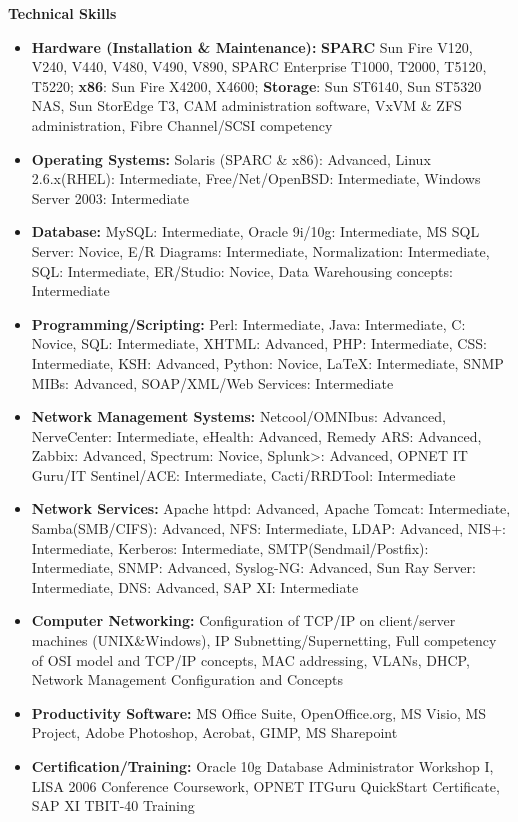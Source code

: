 \documentclass[10pt,oneside]{article}
\newenvironment{ressection}[1]{
	\vspace{4pt}
	\textbf{\selectfont\normalsize#1}
	\begin{itemize}
	\vspace{3pt}
}{
	\end{itemize}
}
\newcommand{\resitem}[1]{
	\vspace{-4pt}
	\item \begin{flushleft} #1 \end{flushleft}
}
\begin{document}
\begin{ressection}{Technical Skills}

	\resitem{\textbf{Hardware (Installation \& Maintenance):} \textbf{SPARC} Sun Fire V120, V240, V440, V480, V490, V890, SPARC Enterprise T1000, T2000, T5120, T5220; \textbf{x86}: Sun Fire X4200, X4600; \textbf{Storage}: Sun ST6140, Sun ST5320 NAS, Sun StorEdge T3, CAM administration software, VxVM \& ZFS administration, Fibre Channel/SCSI competency}

	\resitem{\textbf{Operating Systems:} Solaris (SPARC \& x86): Advanced, Linux 2.6.x(RHEL): Intermediate, Free/Net/OpenBSD: Intermediate, Windows Server 2003: Intermediate}

	\resitem{\textbf{Database:} MySQL: Intermediate, Oracle 9i/10g: Intermediate, MS SQL Server: Novice, E/R Diagrams: Intermediate, Normalization: Intermediate, SQL: Intermediate, ER/Studio: Novice, Data Warehousing concepts: Intermediate}

	\resitem{\textbf{Programming/Scripting:} Perl: Intermediate, Java: Intermediate, C: Novice, SQL: Intermediate, XHTML: Advanced, PHP: Intermediate, CSS: Intermediate, KSH: Advanced, Python: Novice, \LaTeX: Intermediate, SNMP MIBs: Advanced, SOAP/XML/Web Services: Intermediate}

	\resitem{\textbf{Network Management Systems:} Netcool/OMNIbus: Advanced, NerveCenter: Intermediate, eHealth: Advanced, Remedy ARS: Advanced, Zabbix: Advanced, Spectrum: Novice, Splunk>: Advanced, OPNET IT Guru/IT Sentinel/ACE: Intermediate, Cacti/RRDTool: Intermediate}

	\resitem{\textbf{Network Services:} Apache httpd: Advanced, Apache Tomcat: Intermediate, Samba(SMB/CIFS): Advanced, NFS: Intermediate, LDAP: Advanced, NIS+: Intermediate, Kerberos: Intermediate, SMTP(Sendmail/Postfix): Intermediate, SNMP: Advanced, Syslog-NG: Advanced, Sun Ray Server: Intermediate, DNS: Advanced, SAP XI: Intermediate}

	\resitem{\textbf{Computer Networking:} Configuration of TCP/IP on client/server machines (UNIX\&Windows), IP Subnetting/Supernetting, Full competency of OSI model and TCP/IP concepts, MAC addressing, VLANs, DHCP, Network Management Configuration and Concepts}

	\resitem{\textbf{Productivity Software:} MS Office Suite, OpenOffice.org, MS Visio, MS Project, Adobe Photoshop, Acrobat, GIMP, MS Sharepoint}

	\resitem{\textbf{Certification/Training:} Oracle 10g Database Administrator Workshop I, LISA 2006 Conference Coursework, OPNET ITGuru QuickStart Certificate, SAP XI TBIT-40 Training}
	
\end{ressection}
\end{document}
